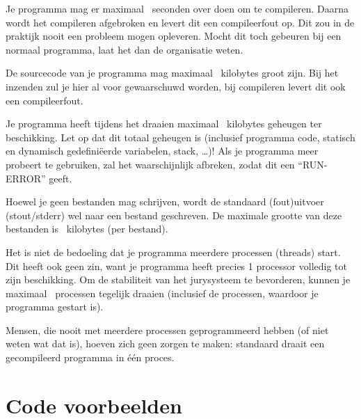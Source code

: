 \documentclass[11pt,titlepage,a4paper]{article}
\begin{document}
\begin{description}
\item[compile-tijd]
Je programma mag er maximaal \COMPILETIME\ seconden over doen om te
compileren. Daarna wordt het compileren afgebroken en levert dit een
compileerfout op. Dit zou in de praktijk nooit een probleem mogen
opleveren. Mocht dit toch gebeuren bij een normaal programma, laat het
dan de organisatie weten.

\item[source grootte]
De sourcecode van je programma mag maximaal \SOURCESIZE\ kilobytes
groot zijn. Bij het inzenden zul je hier al voor gewaarschuwd worden,
bij compileren levert dit ook een compileerfout.

\item[geheugen]
Je programma heeft tijdens het draaien maximaal \MEMLIMIT\ kilobytes
geheugen ter beschikking. Let op dat dit totaal geheugen is (inclusief
programma code, statisch en dynamisch gedefini\"eerde variabelen,
stack, \dots)! Als je programma meer probeert te gebruiken, zal het
waarschijnlijk afbreken, zodat dit een ``RUN-ERROR'' geeft.

\item[bestandsgrootte]
Hoewel je geen bestanden mag schrijven, wordt de standaard (fout)uitvoer
(stout/stderr) wel naar een bestand geschreven. De maximale grootte
van deze bestanden is \FILELIMIT\ kilobytes (per bestand).

\item[aantal processen]
Het is niet de bedoeling dat je programma meerdere processen (threads)
start. Dit heeft ook geen zin, want je programma heeft precies 1
processor volledig tot zijn beschikking. Om de stabiliteit van het
jurysysteem te bevorderen, kunnen je maximaal \PROCLIMIT\ processen
tegelijk draaien (inclusief de processen, waardoor je programma
gestart is).

Mensen, die nooit met meerdere processen geprogrammeerd hebben (of
niet weten wat dat is), hoeven zich geen zorgen te maken: standaard
draait een gecompileerd programma in \'e\'en proces.

\end{description}

\newpage
\appendix

\section{Code voorbeelden}\label{codevoorbeeld}
\end{document}
